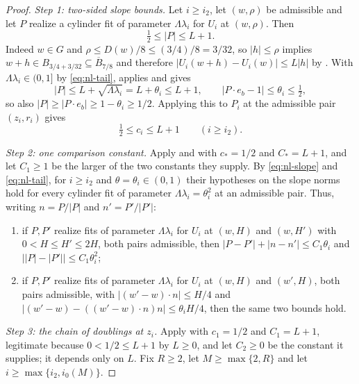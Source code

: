 \begin{proof}
\emph{Step 1: two-sided slope bounds.}
Let $i\ge i_2$, let $(w,\rho)$ be admissible and let $P$ realize a cylinder fit
of parameter $\Lambda\lambda_i$ for $U_i$ at $(w,\rho)$. Then
\begin{equation}\label{eq:nl-slope}
  \tfrac12\le|P|\le L+1 .
\end{equation}
Indeed $w\in G$ and $\rho\le D(w)/8\le(3/4)/8=3/32$, so $|h|\le\rho$ implies
$w+h\in B_{3/4+3/32}\subseteq\overline B_{7/8}$ and therefore
$|U_i(w+h)-U_i(w)|\le L|h|$ by . With
$\Lambda\lambda_i\in(0,1]$ by \eqref{eq:nl-tail},
 applies and gives
\[
  |P|\le L+\sqrt{\Lambda\lambda_i}=L+\theta_i\le L+1,
  \qquad |P\cdot e_b-1|\le\theta_i\le\tfrac12,
\]
so also $|P|\ge|P\cdot e_b|\ge1-\theta_i\ge1/2$. Applying this to $P_i$ at the
admissible pair $(z_i,r_i)$ gives
\begin{equation}\label{eq:nl-base-norm}
  \tfrac12\le c_i\le L+1\qquad(i\ge i_2).
\end{equation}

\emph{Step 2: one comparison constant.}
Apply  and
 with $c_*=1/2$ and $C_*=L+1$, and let
$C_1\ge1$ be the larger of the two constants they supply. By
\eqref{eq:nl-slope} and \eqref{eq:nl-tail}, for $i\ge i_2$ and
$\theta=\theta_i\in(0,1)$ their hypotheses on the slope norms hold for every
cylinder fit of parameter $\Lambda\lambda_i=\theta_i^2$ at an admissible pair.
Thus, writing $n=P/|P|$ and $n'=P'/|P'|$:
\begin{enumerate}
\item[(a)] if $P,P'$ realize fits of parameter $\Lambda\lambda_i$ for $U_i$ at
$(w,H)$ and $(w,H')$ with $0<H\le H'\le2H$, both pairs admissible, then
$|P-P'|+|n-n'|\le C_1\theta_i$ and $\bigl||P|-|P'|\bigr|\le C_1\theta_i^2$;
\item[(b)] if $P,P'$ realize fits of parameter $\Lambda\lambda_i$ for $U_i$ at
$(w,H)$ and $(w',H)$, both pairs admissible, with
$|(w'-w)\cdot n|\le H/4$ and $|(w'-w)-((w'-w)\cdot n)n|\le\theta_iH/4$, then the
same two bounds hold.
\end{enumerate}

\emph{Step 3: the chain of doublings at $z_i$.}
Apply  with $c_1=1/2$ and $C_1=L+1$, legitimate
because $0<1/2\le L+1$ by $L\ge0$, and let $C_2\ge0$ be the constant it supplies; it
depends only on $L$. Fix $R\ge2$, let $M\ge\max\{2,R\}$ and let
$i\ge\max\{i_2,i_0(M)\}$.


\end{proof}
